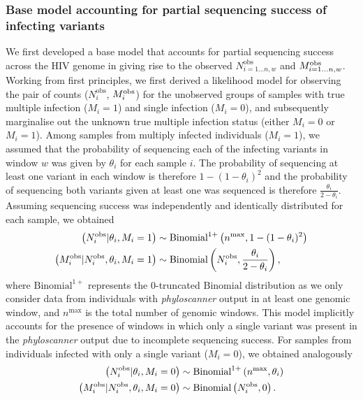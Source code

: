 \documentclass[10pt,letterpaper]{article}
\newcommand{\MI}{M^{\text{\text{obs}}}}
\begin{document}
\subsubsection{Base model accounting for partial sequencing success of infecting variants}
\label{sec:base_model}
We first developed a base model that accounts for partial sequencing success across the HIV genome in giving rise to the observed $N^{\text{obs}}_{i=1...n,w}$ and $\MI_{i=1...n,w}$. Working from first principles, we first derived a likelihood model for observing the pair of counts ($N^{\text{obs}}_{i}$, $\MI_i$) for the unobserved groups of samples with true multiple infection ($M_i = 1$) and single infection ($M_i = 0$), and subsequently marginalise out the unknown true multiple infection status (either $M_i = 0$ or $M_i = 1$). Among samples from multiply infected individuals ($M_i = 1$), we assumed that the probability of sequencing each of the infecting variants in window $w$ was given by $\theta_i$ for each sample $i$. The probability of sequencing at least one variant in each window is therefore $1 - (1-\theta_i)^2$ and the probability of sequencing both variants given at least one was sequenced is therefore $\frac{\theta_i}{2-\theta_i}$. Assuming sequencing success was independently and identically distributed for each sample, we obtained
\begin{subequations}
\label{eq:base-bin-ni-m1} 
    \begin{align}
    \left(N^{\text{obs}}_i|\theta_i, M_i = 1\right) & \sim \text{Binomial}^{1+}\left(n^{\text{max}}, 1-(1-\theta_i)^2\right)\\ 
    \left(\MI_i|N^{\text{obs}}_i, \theta_i, M_i = 1\right) & \sim \text{Binomial}\left(N^{\text{obs}}_i, \frac{\theta_i}{2-\theta_i}\right),
    \end{align} 
\end{subequations}
where $\text{Binomial}^{1+}$ represents the 0-truncated $\text{Binomial}$ distribution as we only consider data from individuals with \textit{phyloscanner} output in at least one genomic window, and $n^{\text{max}}$ is the total number of genomic windows. This model implicitly accounts for the presence of windows in which only a single variant was present in the \textit{phyloscanner} output due to incomplete sequencing success. For samples from individuals infected with only a single variant ($M_i = 0$), we obtained analogously 
\begin{subequations}
    \begin{align}
    \left(N_i^{\text{obs}}|\theta_i, M_i = 0\right) & \sim \text{Binomial}^{1+}\left({n^{\text{max}}}, \theta_i\right)\\ \label{eq:base-bin-ni-m0}
    \left(\MI_i|N^{\text{obs}}_i, \theta_i, M_i = 0\right) &\sim \text{Binomial}\left(N^{\text{obs}}_i, 0\right).
\end{align}
\end{subequations}
\end{document}
